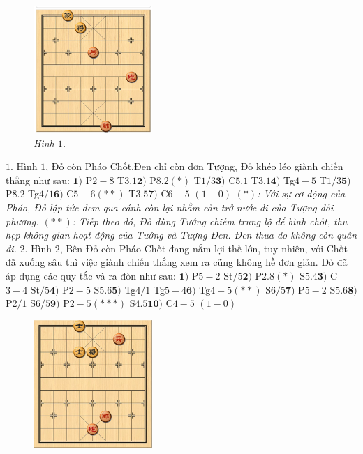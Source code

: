 \begin{multicols}{2}
	\begin{figure}[H]
		\vspace*{-5pt}
		\centering
		\captionsetup{labelformat= empty, justification=centering}
		\includegraphics[width= 0.4\textwidth]{1}
		\caption{\small\textit{\color{gocco}Hình $1$.}}
		\vspace*{-10pt}
	\end{figure}
	$1.$	Hình $1$, Đỏ còn Pháo Chốt,Đen chỉ còn đơn Tượng, Đỏ khéo léo giành chiến thắng như sau: 
	\vskip 0.1cm
	$\pmb{1)}$	P$2-8$ T$3.1$\quad $\pmb{2)}$ P$8.2(*)$ T$1/3$\quad $\pmb{3)}$ C$5.1$ T$3.1$\quad $\pmb{4)}$ Tg$4-5$ T$1/3$\quad $\pmb{5)}$ P$8.2$ Tg$4/1$\quad $\pmb{6)}$ C$5-6(**)$ T$3.5$\quad $\pmb{7)}$ C$6-5$ $(1-0)$
	\vskip 0.1cm
	\textit{$(*)$: Với sự cơ động của Pháo, Đỏ lập tức đem qua cánh còn lại nhằm cản trở nước đi của Tượng đối phương.
	\vskip 0.1cm
	$(**)$: Tiếp theo đó, Đỏ dùng Tướng chiếm trung lộ để bình chốt, thu hẹp không gian hoạt động của Tướng và Tượng Đen. Đen thua do không còn quân đi.}
	\vskip 0.1cm
	$2.$	Hình $2$, Bên Đỏ còn Pháo Chốt đang nắm lợi thế lớn, tuy nhiên, với Chốt đã xuống sâu thì việc giành chiến thắng xem ra cũng không hề đơn giản. Đỏ đã áp dụng các quy tắc và ra đòn như sau:
	\vskip 0.1cm
	$\pmb{1)}$	P$5-2$ St$/5$\quad $\pmb{2)}$ P$2.8(*)$ S$5.4$\quad $\pmb{3)}$ C$3-4$ St$/5$\quad $\pmb{4)}$ P$2-5$ S$5.6$\quad $\pmb{5)}$ Tg$4/1$ Tg$5-4$\quad $\pmb{6)}$ Tg$4-5(**)$ S$6/5$\quad $\pmb{7)}$ P$5-2$ S$5.6$\quad $\pmb{8)}$ P$2/1$ S$6/5$\quad $\pmb{9)}$ P$2-5(***)$ S$4.5$\quad $\pmb{10)}$ C$4-5$ $(1-0)$
	\begin{figure}[H]
		\vspace*{5pt}
		\centering
		\captionsetup{labelformat= empty, justification=centering}
		\includegraphics[width= 0.4\textwidth]{2}

\end{figure}
\end{multicols}
